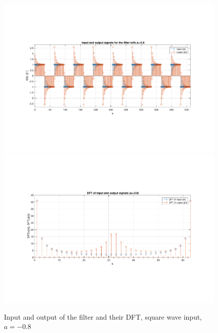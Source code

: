 \begin{figure} [H]
	\centering
	\includegraphics[trim={2.5cm 5cm 2.5cm 5cm}, clip, width=0.75\linewidth]{io_sw_2}
	\includegraphics[trim={2.5cm 5cm 2.5cm 5cm}, clip, width=0.75\linewidth]{dft_sw_2}
	\caption{Input and output of the filter and their DFT, square wave input, $a=-0.8$}
	\label{fig:t1_io_sw_2}
\end{figure}
